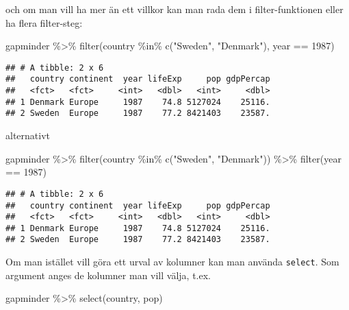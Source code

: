 \documentclass[
]{book}
\newenvironment{Shaded}{\begin{snugshade}}{\end{snugshade}}
\newcommand{\DecValTok}[1]{\textcolor[rgb]{0.00,0.00,0.81}{#1}}
\newcommand{\FunctionTok}[1]{\textcolor[rgb]{0.00,0.00,0.00}{#1}}
\newcommand{\NormalTok}[1]{#1}
\newcommand{\SpecialCharTok}[1]{\textcolor[rgb]{0.00,0.00,0.00}{#1}}
\newcommand{\StringTok}[1]{\textcolor[rgb]{0.31,0.60,0.02}{#1}}
\theoremstyle{definition}
\theoremstyle{definition}
\theoremstyle{definition}
\theoremstyle{definition}
\theoremstyle{remark}
\begin{document}
och om man vill ha mer än ett villkor kan man rada dem i filter-funktionen eller ha flera filter-steg:

\begin{Shaded}
\begin{Highlighting}[]
\NormalTok{gapminder }\SpecialCharTok{\%\textgreater{}\%} 
  \FunctionTok{filter}\NormalTok{(country }\SpecialCharTok{\%in\%} \FunctionTok{c}\NormalTok{(}\StringTok{"Sweden"}\NormalTok{, }\StringTok{"Denmark"}\NormalTok{),}
\NormalTok{         year }\SpecialCharTok{==} \DecValTok{1987}\NormalTok{)}
\end{Highlighting}
\end{Shaded}

\begin{verbatim}
## # A tibble: 2 x 6
##   country continent  year lifeExp     pop gdpPercap
##   <fct>   <fct>     <int>   <dbl>   <int>     <dbl>
## 1 Denmark Europe     1987    74.8 5127024    25116.
## 2 Sweden  Europe     1987    77.2 8421403    23587.
\end{verbatim}

alternativt

\begin{Shaded}
\begin{Highlighting}[]
\NormalTok{gapminder }\SpecialCharTok{\%\textgreater{}\%} 
  \FunctionTok{filter}\NormalTok{(country }\SpecialCharTok{\%in\%} \FunctionTok{c}\NormalTok{(}\StringTok{"Sweden"}\NormalTok{, }\StringTok{"Denmark"}\NormalTok{)) }\SpecialCharTok{\%\textgreater{}\%} 
  \FunctionTok{filter}\NormalTok{(year }\SpecialCharTok{==} \DecValTok{1987}\NormalTok{)}
\end{Highlighting}
\end{Shaded}

\begin{verbatim}
## # A tibble: 2 x 6
##   country continent  year lifeExp     pop gdpPercap
##   <fct>   <fct>     <int>   <dbl>   <int>     <dbl>
## 1 Denmark Europe     1987    74.8 5127024    25116.
## 2 Sweden  Europe     1987    77.2 8421403    23587.
\end{verbatim}

Om man istället vill göra ett urval av kolumner kan man använda \texttt{select}. Som argument anges de kolumner man vill välja, t.ex.

\begin{Shaded}
\begin{Highlighting}[]
\NormalTok{gapminder }\SpecialCharTok{\%\textgreater{}\%} 
  \FunctionTok{select}\NormalTok{(country, pop)}
\end{Highlighting}
\end{Shaded}
\end{document}

